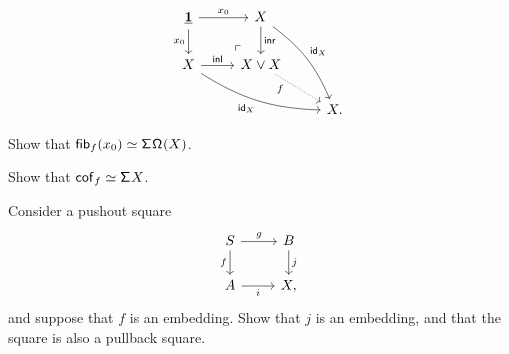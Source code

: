 \begin{exercises}
\begin{equation*}
\begin{tikzcd}
\unit \arrow[d,swap,"x_0"] \arrow[r,"x_0"] \arrow[dr, phantom, "\ulcorner", very near end] & X \arrow[d,"\inr"] \arrow[ddr,bend left=15,"{\idfunc[X]}"] \\
X \arrow[r,"\inl"] \arrow[drr,bend right=15,swap,"{\idfunc[X]}"] & X\vee X \arrow[dr,densely dotted,near start,swap,"f"] \\
& & X.
\end{tikzcd}
\end{equation*}
\begin{subexenum}
\item Show that $\eqv{\fib{f}{x_0}}{\susp\loopspace{X}}$. 
\item Show that $\eqv{\mathsf{cof}_f}{\susp X}$.
\end{subexenum}
\item Consider a pushout square
\begin{equation*}
\begin{tikzcd}
S \arrow[r,"g"] \arrow[d,swap,"f"] & B \arrow[d,"j"] \\
A \arrow[r,swap,"i"] & X,
\end{tikzcd}
\end{equation*}
and suppose that $f$ is an embedding. Show that $j$ is an embedding, and that the square is also a pullback square.
\end{exercises}
